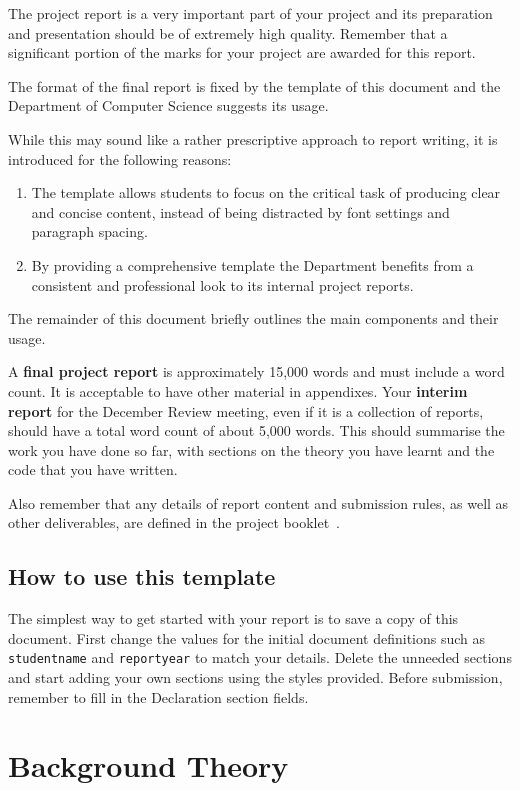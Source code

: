 \documentclass[]{final_report}
\begin{document}
The project report is a very important part of your project and its preparation and presentation should be of extremely high quality. Remember that a significant portion of the marks for your project are awarded for this report. 

The format of the final report is fixed by the template of this document and the Department of Computer Science suggests its usage. 

While this may sound like a rather prescriptive approach to report writing, it is introduced for the following reasons:
\begin{enumerate}
 \item The template allows students to focus on the critical task of producing clear and concise content, instead of being distracted by font settings and paragraph spacing. 
 \item By providing a comprehensive template the Department benefits from a consistent and professional look to its internal project reports.
\end{enumerate}

The remainder of this document briefly outlines the main components and their usage.

A \textbf{final project report} is approximately 15,000 words and must include a word count. It is acceptable to have other material in appendixes.  
Your \textbf{interim report} for the December Review meeting, even if it is a collection of reports, should have a total word count of about 5,000 words. 
This should summarise the work you have done so far, with sections on the theory you have learnt and the code that you have written.

Also remember that any details of report content and submission rules, as well as other deliverables, are defined in the project booklet~\cite{COHEN:2013}.

\section{How to use this template}

The simplest way to get started with your report is to save a copy of this document. 
First change the values for the initial document definitions such as \verb|studentname| and \verb|reportyear| to match your details.
Delete the unneeded sections and start adding your own sections using the styles provided.
Before submission, remember to fill in the Declaration section fields.

\chapter{Background Theory}
\end{document}
